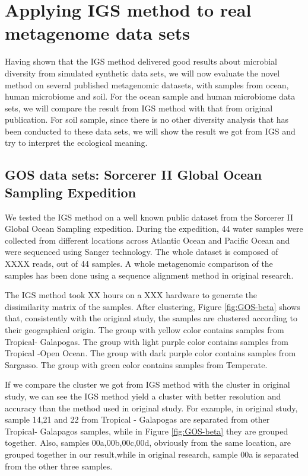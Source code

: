 \section{Applying IGS method to real metagenome data sets}

Having shown that the IGS method delivered good results about microbial diversity 
from simulated synthetic data sets, 
we will now evaluate the novel method on several published metagenomic 
datasets, with samples 
from ocean, human microbiome and soil. For the ocean sample and human microbiome 
data sets, we will compare the result from IGS method
with that from original publication. For soil sample, since there is no other 
diversity analysis that has been conducted
to these data sets, we will show the result we got from IGS and try to 
interpret the ecological meaning.


\subsection{GOS data sets: Sorcerer II Global Ocean Sampling Expedition}

We tested the IGS method on a well known public dataset from the Sorcerer II 
Global Ocean Sampling expedition.
During the expedition, 44 water samples were collected from different locations across
Atlantic Ocean and Pacific Ocean and were sequenced using Sanger technology. 
The whole dataset is composed of XXXX reads, out of 44 samples.
A whole metagenomic comparison of the samples has been done
using a sequence alignment method in original research. 

The IGS method took XX hours on a XXX hardware to generate the dissimilarity 
matrix of the samples. After clustering, 
Figure \ref{fig:GOS-beta} shows that, consistently with the original study, 
the samples are clustered according to their 
geographical origin. The group with yellow color contains samples from 
Tropical- Galapogas. The group with light purple color
contains samples from Tropical -Open Ocean. The group with dark purple 
color contains samples from Sargasso. The group 
with green color contains samples from Temperate. 

If we compare the cluster we got from IGS method with the cluster in original 
study, we can see the IGS method yield a
cluster with better resolution and accuracy than the method used in original 
study. For example, in original study,
sample 14,21 and 22 from Tropical - Galapogas are separated from other 
Tropical- Galapagos samples, while in Figure \ref{fig:GOS-beta} 
they are grouped together. Also, samples 00a,00b,00c,00d, obviously from the 
same location, are grouped together in our result,while
in original research, sample 00a is separated from the other three samples.

